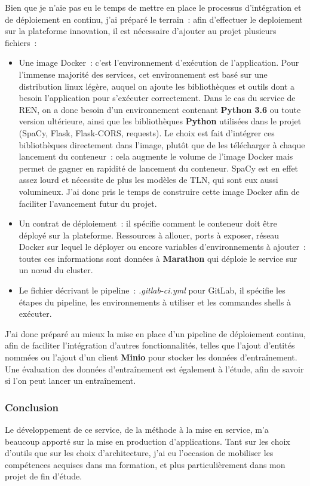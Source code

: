 Bien que je n'aie pas eu le temps de mettre en place le processus d'intégration et de déploiement en continu, j'ai préparé le terrain~: afin d'effectuer le deploiement sur la plateforme innovation, il est nécessaire d'ajouter au projet plusieurs fichiers~:
\vspace{5pt}
\begin{itemize}
    \item Une image Docker~: c'est l'environnement d'exécution de l'application. Pour l'immense majorité des services, cet environnement est basé sur une distribution linux légère, auquel on ajoute les bibliothèques et outils dont a besoin l'application pour s'exécuter correctement. Dans le cas du service de REN, on a donc besoin d'un environnement contenant \textbf{Python 3.6} ou toute version ultérieure, ainsi que les bibliothèques \textbf{Python} utilisées dans le projet (SpaCy, Flask, Flask-CORS, requests). Le choix est fait d'intégrer ces bibliothèques directement dans l'image, plutôt que de les télécharger à chaque lancement du conteneur~: cela augmente le volume de l'image Docker mais permet de gagner en rapidité de lancement du conteneur. SpaCy est en effet assez lourd et nécessite de plus les modèles de TLN, qui sont eux aussi volumineux. J'ai donc pris le temps de construire cette image Docker afin de faciliter l'avancement futur du projet.
    \vspace{5pt}
    \item Un contrat de déploiement~: il spécifie comment le conteneur doit être déployé sur la plateforme. Ressources à allouer, ports à exposer, réseau Docker sur lequel le déployer ou encore variables d'environnements à ajouter~: toutes ces informations sont données à \textbf{Marathon} qui déploie le service sur un nœud du cluster. 
    \vspace{5pt}
    \item Le fichier décrivant le pipeline~: \textit{.gitlab-ci.yml} pour GitLab, il spécifie les étapes du pipeline, les environnements à utiliser et les commandes shells à exécuter.
    \newline
\end{itemize}

J'ai donc préparé au mieux la mise en place d'un pipeline de déploiement continu, afin de faciliter l'intégration d'autres fonctionnalités, telles que l'ajout d'entités nommées ou l'ajout d'un client \textbf{Minio} pour stocker les données d'entraînement. Une évaluation des données d'entraînement est également à l'étude, afin de savoir si l'on peut lancer un entraînement.
\label{section 3.2.3}

\subsubsection*{Conclusion}
Le développement de ce service, de la méthode à la mise en service, m'a beaucoup apporté sur la mise en production d'applications. Tant sur les choix d'outils que sur les choix d'architecture, j'ai eu l'occasion de mobiliser les compétences acquises dans ma formation, et plus particulièrement dans mon projet de fin d'étude.
